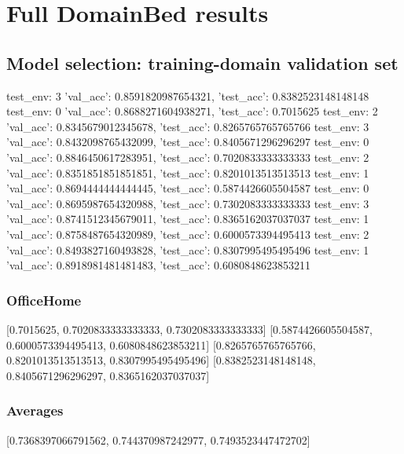 \documentclass{article}
\begin{document}
\section{Full DomainBed results}

\subsection{Model selection: training-domain validation set}
test_env: 3
{'val_acc': 0.8591820987654321, 'test_acc': 0.8382523148148148}
test_env: 0
{'val_acc': 0.8688271604938271, 'test_acc': 0.7015625}
test_env: 2
{'val_acc': 0.8345679012345678, 'test_acc': 0.8265765765765766}
test_env: 3
{'val_acc': 0.8432098765432099, 'test_acc': 0.8405671296296297}
test_env: 0
{'val_acc': 0.8846450617283951, 'test_acc': 0.7020833333333333}
test_env: 2
{'val_acc': 0.8351851851851851, 'test_acc': 0.8201013513513513}
test_env: 1
{'val_acc': 0.8694444444444445, 'test_acc': 0.5874426605504587}
test_env: 0
{'val_acc': 0.8695987654320988, 'test_acc': 0.7302083333333333}
test_env: 3
{'val_acc': 0.8741512345679011, 'test_acc': 0.8365162037037037}
test_env: 1
{'val_acc': 0.8758487654320989, 'test_acc': 0.6000573394495413}
test_env: 2
{'val_acc': 0.8493827160493828, 'test_acc': 0.8307995495495496}
test_env: 1
{'val_acc': 0.8918981481481483, 'test_acc': 0.6080848623853211}

\subsubsection{OfficeHome}
[0.7015625, 0.7020833333333333, 0.7302083333333333]
[0.5874426605504587, 0.6000573394495413, 0.6080848623853211]
[0.8265765765765766, 0.8201013513513513, 0.8307995495495496]
[0.8382523148148148, 0.8405671296296297, 0.8365162037037037]

\begin{center}
\end{center}

\subsubsection{Averages}
[0.7368397066791562, 0.744370987242977, 0.7493523447472702]

\begin{center}
\end{center}
\end{document}
